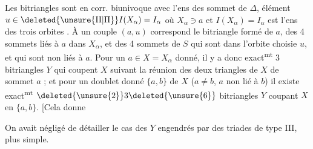 Les bitriangles sont en corr. biunivoque avec l'ens des  sommet de $\Delta$,   élément $u\in\deleted{\unsure{\mathrm{II}|\Pi}}I(X_\alpha)=I_\alpha$ où $X_\alpha\ni a$ et $I(X_\alpha)=I_\alpha$ est l'ens des trois orbites .
À un couple $(a,u)$ correspond le bitriangle formé de $a$, des 4 sommets liés à $a$ dans $X_\alpha$, et des 4 sommets de $S$ qui sont dans l'orbite choisie $u$, et qui sont non liés à $a$.
Pour un $a\in X=X_\alpha$ donné, il y a donc exact\textsuperscript{mt} 3 bitriangles $Y$ qui coupent $X$ suivant la réunion des deux triangles de $X$ de sommet $a$ ; et pour un doublet donné $\{a,b\}$ de $X$ ($a\ne b$, $a$ non lié à $b$) il existe exact\textsuperscript{mt} $\deleted{\unsure{2}}3\deleted{\unsure{6}}$ bitriangles $Y$ coupant $X$ en $\{a,b\}$. [Cela donne


On avait  négligé de détailler le cas des $Y$ engendrés par des triades de type III, plus simple.



